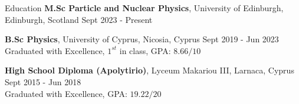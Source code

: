 \documentclass{resume} %
\begin{document}
        \begin{rSection}{Education}
                {\bf M.Sc Particle and Nuclear Physics}, University of Edinburgh, Edinburgh, Scotland \hfill {Sept 2023 - Present}
                
                {\bf B.Sc Physics}, University of Cyprus, Nicosia, Cyprus \hfill {Sept 2019 - Jun 2023}\\
                Graduated with Excellence, $1^{st}$ in class, GPA: $8.66/10$
                
                {\bf High School Diploma (Apolytirio)}, Lyceum Makariou III, Larnaca, Cyprus \hfill {Sept 2015 - Jun 2018}\\
        Graduated with Excellence, GPA: $19.22/20$
        \end{rSection}

        \bigbreak
\end{document}
